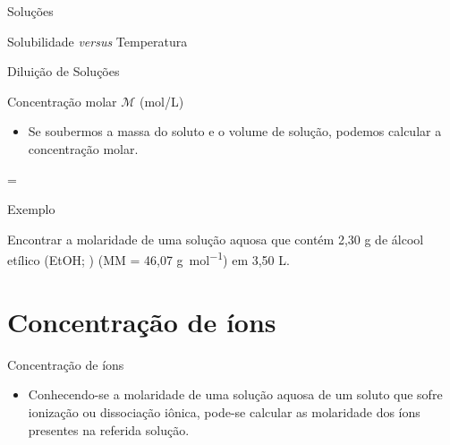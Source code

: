 \documentclass[presentation,professionalfonts,aspectratio=169]{beamer}
\begin{document}
\begin{frame}[label={sec:orgbd3cab3}]{Soluções}
\begin{description}
\begin{frame}[label={sec:org3015545}]{Solubilidade \emph{versus} Temperatura}
\begin{frame}[label={sec:orgc802ffa}]{Diluição de Soluções}
\begin{frame}[label={sec:org992c6d6}]{Concentração molar \(\mathcal{M}\) (mol/L)}
\begin{itemize}
\begin{tcolorbox}
= \Longrightarrow {}=
\end{tcolorbox}

\item Se soubermos a massa do soluto e o volume de solução, podemos calcular a concentração molar.
\end{itemize}

\begin{tcolorbox}
=
\end{tcolorbox}
\end{frame}

\begin{frame}[label={sec:orge768519}]{Exemplo}
\begin{question}
Encontrar a molaridade de uma solução aquosa que contém 2,30 g de álcool
etílico (EtOH; ) (MM = 46,07 \unit{\gram\per\mole}) em 3,50 L.
\end{question}

\end{frame}


\section{Concentração de íons}
\label{sec:org4ba41a0}

\begin{frame}[label={sec:orgc63cdda}]{Concentração de íons}
\begin{itemize}
\item Conhecendo-se a molaridade de uma solução aquosa de um soluto que sofre ionização ou dissociação iônica, pode-se calcular as molaridade dos íons presentes na referida solução.
\end{itemize}


\end{frame}
\end{frame}
\end{frame}
\end{description}
\end{frame}
\end{document}
